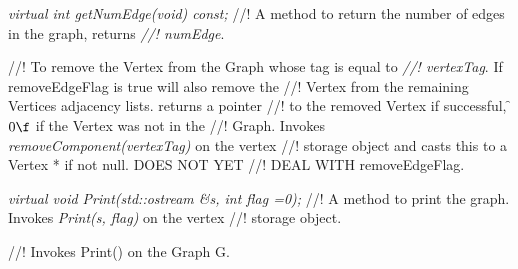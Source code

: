 {\em virtual int getNumEdge(void) const;}
//! A method to return the number of edges in the graph, returns {\em
//! numEdge}. 

//! To remove the Vertex from the Graph whose tag is equal to {\em
//! vertexTag}. If \p removeEdgeFlag is \p true will also remove the
//! Vertex from the remaining Vertices adjacency lists. returns a pointer
//! to the removed Vertex if successful, \f$0\f$ if the Vertex was not in the
//! Graph. Invokes {\em removeComponent(vertexTag)} on the vertex
//! storage object and casts this to a Vertex * if not null. DOES NOT YET
//! DEAL WITH \p removeEdgeFlag.

{\em virtual void Print(std::ostream \&s, int flag =0);}
//! A method to print the graph. Invokes {\em Print(s, flag)} on the vertex
//! storage object.

//! Invokes Print() on the Graph \p G.

